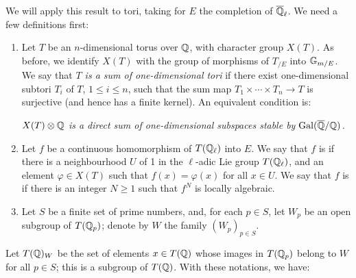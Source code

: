 We will apply this result to tori, taking for $E$ the completion
of $\overline{\mathbb{Q}}_\ell$. We need a few definitions first:
\begin{enumerate}[a/, wide]
\item Let $T$ be an $n$-dimensional torus over $\mathbb{Q}$, with character
	group $X(T)$. As before, we identify $X(T)$ with the group of morphisms
	of $T_{/E}$ into $\mathbb{G}_{m/E}$. We say that \emph{$T$ is a sum of
	one-dimensional tori} if there exist one-dimensional subtori $T_i$ of
	$T$, $1 \le i \le n$, such that the sum map $T_1 \times \cdots \times
	T_n \to T$ is surjective (and hence has a finite kernel). An equivalent
	condition is:
	\begin{displayquote}
		\slshape
		$X(T) \otimes \mathbb{Q}$ is a direct sum of one-dimensional
		\dpage
		subspaces stable by $\operatorname{Gal}(\overline{\mathbb{Q}}/\mathbb{Q})$.
	\end{displayquote}

\item Let $f$ be a continuous homomorphism of $T(\mathbb{Q}_\ell)$ into $E$. We say
	that $f$ is  if there is a neighbourhood $U$ of 1 in the $\ell$-adic
	Lie group $T(\mathbb{Q}_\ell)$, and an element $\varphi \in X(T)$ such that
	$f(x) = \varphi(x)$ for all $x \in U$. We say that $f$ is
	 if there is an integer $N \ge 1$ such that $f^N$ is
	locally algebraic.

\item Let $S$ be a finite set of prime numbers, and, for each $p \in S$, let
	$W_p$ be an open subgroup of $T(\mathbb{Q}_p)$; denote by $W$ the family
	$(W_p)_{p\in S}$.
\end{enumerate}
Let $T(\mathbb{Q})_W$ be the set of elements $x \in T(\mathbb{Q})$ whose images in
$T(\mathbb{Q}_p)$ belong to $W$ for all $p \in S$; this is a subgroup of $T(\mathbb{Q})$.
With these notations, we have:

